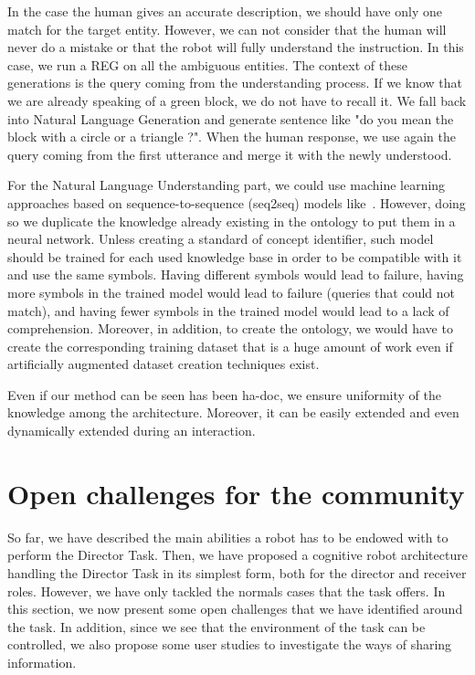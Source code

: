 In the case the human gives an accurate description, we should have only one match for the target entity. However, we can not consider that the human will never do a mistake or that the robot will fully understand the instruction. In this case, we run a REG on all the ambiguous entities. The context of these generations is the \sparql{} query coming from the understanding process. If we know that we are already speaking of a green block, we do not have to recall it. We fall back into Natural Language Generation and generate sentence like "do you mean the block with a circle or a triangle ?". When the human response, we use again the \sparql{} query coming from the first utterance and merge it with the newly understood.

For the Natural Language Understanding part, we could use machine learning approaches based on sequence-to-sequence (seq2seq) models like~\cite{panchbhai_2020_exploring}. However, doing so we duplicate the knowledge already existing in the ontology to put them in a neural network. Unless creating a standard of concept identifier, such model should be trained for each used knowledge base in order to be compatible with it and use the same symbols. Having different symbols would lead to failure, having more symbols in the trained model would lead to failure (queries that could not match), and having fewer symbols in the trained model would lead to a lack of comprehension. Moreover, in addition, to create the ontology, we would have to create the corresponding training dataset that is a huge amount of work even if artificially augmented dataset creation techniques exist.

Even if our method can be seen has been ha-doc, we ensure uniformity of the knowledge among the architecture. Moreover, it can be easily extended and even dynamically extended during an interaction.


\section{Open challenges for the community}

So far, we have described the main abilities a robot has to be endowed with to perform the Director Task. Then, we have proposed a cognitive robot architecture handling the Director Task in its simplest form, both for the director and receiver roles. However, we have only tackled the normals cases that the task offers. In this section, we now present some open challenges that we have identified around the task. In addition, since we see that the environment of the task can be controlled, we also propose some user studies to investigate the ways of sharing information.

